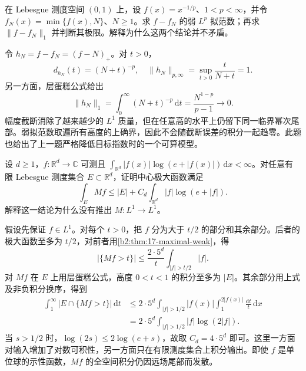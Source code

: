 \begin{exercise}\label{b2:ex:17-new-4}
在 Lebesgue 测度空间 \((0,1)\) 上，设 \(f(x)=x^{-1/p}\)、\(1<p<\infty\)，并令 \(f_N(x)=\min\{f(x),N\}\)、\(N\geq1\)。求 \(f-f_N\) 的弱 \(L^p\) 拟范数；再求 \(\|f-f_N\|_1\) 并判断其极限。解释为什么这两个结论并不矛盾。
\end{exercise}
\begin{solution}
令 \(h_N=f-f_N=(f-N)_+\)。对 \(t>0\)，
\[
 d_{h_N}(t)=(N+t)^{-p},\quad
 \|h_N\|_{p,\infty}=\sup_{t>0}\frac{t}{N+t}=1.
\]
另一方面，层蛋糕公式给出
\[
 \|h_N\|_1=\int_0^\infty(N+t)^{-p}\,\mathrm dt
 =\frac{N^{1-p}}{p-1}\longrightarrow0.
\]
幅度截断消除了越来越少的 \(L^1\) 质量，但在任意高的水平上仍留下同一临界幂次尾部。弱拟范数取遍所有高度的上确界，因此不会随截断误差的积分一起趋零。此题也给出了上一题严格降低目标指数时的一个可算模型。
\end{solution}

\begin{exercise}\label{b2:ex:17-new-5}
设 \(d\geq1\)，\(f:\mathbb R^d\to\mathbb C\) 可测且
\(\int_{\mathbb R^d}|f(x)|\log(e+|f(x)|)\,\mathrm dx<\infty\)。对任意有限 Lebesgue 测度集合 \(E\subset\mathbb R^d\)，证明中心极大函数满足
\[
 \int_E Mf\leq |E|+C_d\int_{\mathbb R^d}|f|\log(e+|f|).
\]
解释这一结论为什么没有推出 \(M:L^1\to L^1\)。
\end{exercise}
\begin{solution}
假设先保证 \(f\in L^1\)。对每个 \(t>0\)，把 \(f\) 分为大于 \(t/2\) 的部分和其余部分。后者的极大函数至多为 \(t/2\)，对前者用\cref{b2:thm:17-maximal-weak}，得
\[
 |\{Mf>t\}|\leq\frac{2\cdot5^d}{t}\int_{|f|>t/2}|f|.
\]
对 \(Mf\) 在 \(E\) 上用层蛋糕公式，高度 \(0<t<1\) 的积分至多为 \(|E|\)。其余部分用上式及非负积分换序，得到
\[
 \begin{aligned}
 \int_1^\infty |E\cap\{Mf>t\}|\,\mathrm dt
 &\leq2\cdot5^d\int_{|f|>1/2}|f(x)|
       \int_1^{2|f(x)|}\frac{\mathrm dt}{t}\,\mathrm dx\\
 &=2\cdot5^d\int_{|f|>1/2}|f|\log(2|f|).
 \end{aligned}
\]
当 \(s>1/2\) 时，\(\log(2s)\leq2\log(e+s)\)，故取 \(C_d=4\cdot5^d\) 即可。这里一方面对输入增加了对数可积性，另一方面只在有限测度集合上积分输出。即使 \(f\) 是单位球的示性函数，\(Mf\) 的全空间积分仍因远场尾部而发散。
\end{solution}

